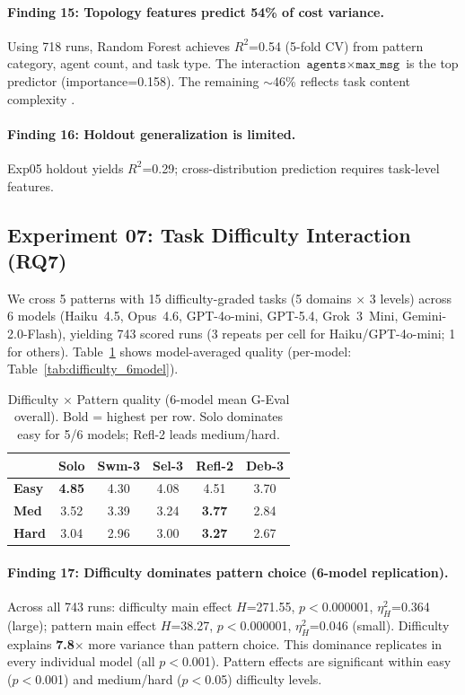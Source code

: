 \documentclass{article}
\begin{document}
\paragraph{Finding 15: Topology features predict 54\% of cost variance.} Using 718 runs, Random Forest achieves $R^2$=0.54 (5-fold CV) from pattern category, agent count, and task type. The interaction $\texttt{agents} \times \texttt{max\_msg}$ is the top predictor (importance=0.158). The remaining $\sim$46\% reflects task content complexity \citep{cohen1988}.

\paragraph{Finding 16: Holdout generalization is limited.} Exp05 holdout yields $R^2$=0.29; cross-distribution prediction requires task-level features.

\subsection{Experiment 07: Task Difficulty Interaction (RQ7)}
\label{sec:exp07}

We cross 5 patterns with 15 difficulty-graded tasks (5 domains $\times$ 3 levels) across 6 models (Haiku~4.5, Opus~4.6, GPT-4o-mini, GPT-5.4, Grok~3~Mini, Gemini-2.0-Flash), yielding 743 scored runs (3 repeats per cell for Haiku/GPT-4o-mini; 1 for others). Table~\ref{tab:difficulty} shows model-averaged quality (per-model: Table~\ref{tab:difficulty_6model}).

\begin{table}[t]
\centering
\caption{Difficulty $\times$ Pattern quality (6-model mean G-Eval overall). Bold = highest per row. Solo dominates easy for 5/6 models; Refl-2 leads medium/hard.}
\label{tab:difficulty}
{\small
\begin{tabular}{@{}lccccc@{}}
\toprule
& \textbf{Solo} & \textbf{Swm-3} & \textbf{Sel-3} & \textbf{Refl-2} & \textbf{Deb-3} \\
\midrule
\textbf{Easy} & \textbf{4.85} & 4.30 & 4.08 & 4.51 & 3.70 \\
\textbf{Med} & 3.52 & 3.39 & 3.24 & \textbf{3.77} & 2.84 \\
\textbf{Hard} & 3.04 & 2.96 & 3.00 & \textbf{3.27} & 2.67 \\
\bottomrule
\end{tabular}
}
\end{table}

\paragraph{Finding 17: Difficulty dominates pattern choice (6-model replication).} Across all 743 runs: difficulty main effect $H$=271.55, $p<$0.000001, $\eta^2_H$=0.364 (large); pattern main effect $H$=38.27, $p<$0.000001, $\eta^2_H$=0.046 (small). Difficulty explains \textbf{7.8$\times$} more variance than pattern choice. This dominance replicates in every individual model (all $p<$0.001). Pattern effects are significant within easy ($p<$0.001) and medium/hard ($p<$0.05) difficulty levels.
\end{document}
